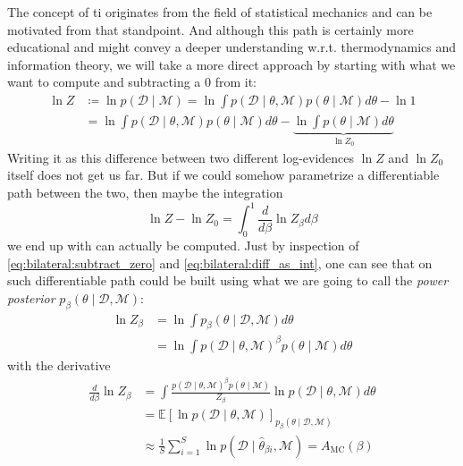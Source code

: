 \documentclass[\relativeRoot/main.tex]{subfiles}
\begin{document}
The concept of \gls{ti} originates from the field of statistical mechanics and can be motivated from that standpoint. And although this path is certainly more educational and might convey a deeper understanding w.r.t. thermodynamics and information theory, we will take a more direct approach by starting with what we want to compute and subtracting a 0 from it:
%
\begin{equation} \label{eq:bilateral:subtract_zero}
    \begin{aligned}
        \ln{Z} &\coloneqq \ln{p(\boldsymbol{\mathcal{D}} \mid \mathcal{M})} = \ln{\int{ p\left( \boldsymbol{\mathcal{D}} \mid \theta, \mathcal{M} \right) p(\theta \mid \mathcal{M}) d\theta}} - \ln{1} \\
        &= \ln{\int{ p\left( \boldsymbol{\mathcal{D}} \mid \theta, \mathcal{M} \right) p(\theta \mid \mathcal{M}) d\theta}} - \underbrace{ \ln{ \int{ p(\theta \mid \mathcal{M}) d\theta} } }_{\ln{Z_0}}
    \end{aligned}
\end{equation}
%
Writing it as this difference between two different log-evidences $\ln{Z}$ and $\ln{Z_0}$ itself does not get us far. But if we could somehow parametrize a differentiable path between the two, then maybe the integration
%
\begin{equation} \label{eq:bilateral:diff_as_int}
    \ln{Z} - \ln{Z_0} = \int_0^1{ \frac{d}{d\beta} \ln{Z_\beta} d\beta}
\end{equation}
%
we end up with can actually be computed. Just by inspection of \cref{eq:bilateral:subtract_zero} and \cref{eq:bilateral:diff_as_int}, one can see that on such differentiable path could be built using what we are going to call the \emph{power posterior} $p_\beta (\theta \mid \boldsymbol{\mathcal{D}}, \mathcal{M})$:
%
\begin{equation}
    \begin{aligned}
        \ln{Z_\beta} &= \ln{ \int{ p_\beta (\theta \mid \boldsymbol{\mathcal{D}}, \mathcal{M}) d\theta} } \\
        &= \ln{\int{ p\left( \boldsymbol{\mathcal{D}} \mid \theta, \mathcal{M} \right)^\beta p(\theta \mid \mathcal{M}) d\theta}}
    \end{aligned}
\end{equation}
%
with the derivative
%
\begin{equation}
    \begin{aligned}
        \frac{d}{d\beta} \ln{Z_\beta} &= \int{ \frac{p\left( \boldsymbol{\mathcal{D}} \mid \theta, \mathcal{M} \right)^\beta p(\theta \mid \mathcal{M})}{Z_\beta} \ln{p(\boldsymbol{\mathcal{D}} \mid \theta, \mathcal{M} )} d\theta} \\
        &= \mathbb{E}\left[ \ln{ p(\boldsymbol{\mathcal{D}} \mid \theta, \mathcal{M}) } \right]_{p_\beta (\theta \mid \boldsymbol{\mathcal{D}}, \mathcal{M})} \\
        &\approx \frac{1}{S} \sum_{i=1}^S{ \ln{ p(\boldsymbol{\mathcal{D}} \mid \hat{\theta}_{\beta i}, \mathcal{M}) } } = A_\text{MC}(\beta)
    \end{aligned}
\end{equation}
\end{document}
